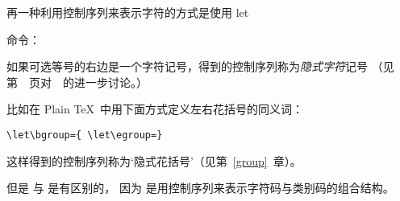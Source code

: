 \documentclass{book}
\begin{document}
再一种利用控制序列来表示字符的方式是使用 \cstoidx let\par{} 命令：
\begin{disp}\end{disp}
如果可选等号的右边是一个字符记号，得到的控制序列称为\emph{隐式字符}记号%
（见第~\pageref{let}~页对~~的进一步讨论。）

比如在 Plain \TeX\ 中用下面方式定义左右花括号的同义词：
\begin{verbatim}
\let\bgroup={ \let\egroup=}
\end{verbatim}
这样得到的控制序列称为`隐式花括号'（见第~\ref{group}~章）。

但是  与  是有区别的，
因为  是用控制序列来表示字符码与类别码的组合结构。
\end{document}
